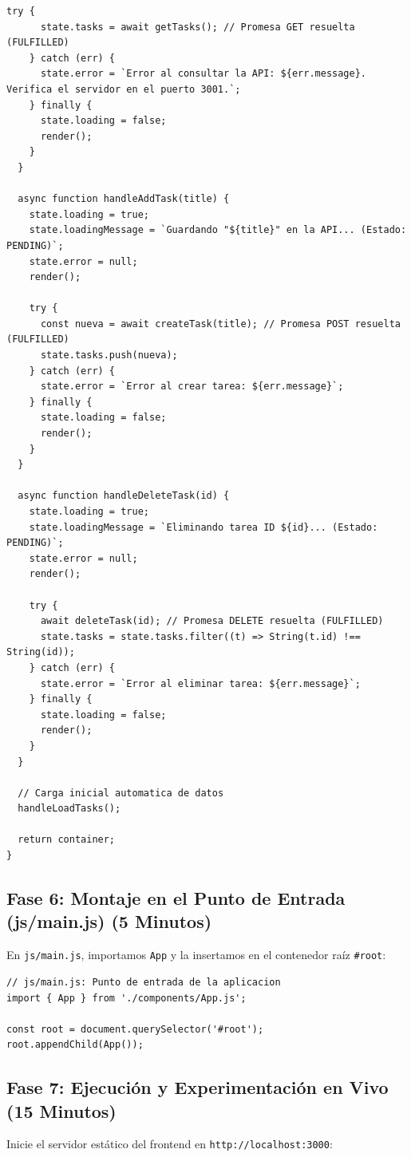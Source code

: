 \documentclass[10pt,letterpaper]{article}
\begin{document}
\begin{lstlisting}[style=jsstyle]
    try {
      state.tasks = await getTasks(); // Promesa GET resuelta (FULFILLED)
    } catch (err) {
      state.error = `Error al consultar la API: ${err.message}. Verifica el servidor en el puerto 3001.`;
    } finally {
      state.loading = false;
      render();
    }
  }

  async function handleAddTask(title) {
    state.loading = true;
    state.loadingMessage = `Guardando "${title}" en la API... (Estado: PENDING)`;
    state.error = null;
    render();

    try {
      const nueva = await createTask(title); // Promesa POST resuelta (FULFILLED)
      state.tasks.push(nueva);
    } catch (err) {
      state.error = `Error al crear tarea: ${err.message}`;
    } finally {
      state.loading = false;
      render();
    }
  }

  async function handleDeleteTask(id) {
    state.loading = true;
    state.loadingMessage = `Eliminando tarea ID ${id}... (Estado: PENDING)`;
    state.error = null;
    render();

    try {
      await deleteTask(id); // Promesa DELETE resuelta (FULFILLED)
      state.tasks = state.tasks.filter((t) => String(t.id) !== String(id));
    } catch (err) {
      state.error = `Error al eliminar tarea: ${err.message}`;
    } finally {
      state.loading = false;
      render();
    }
  }

  // Carga inicial automatica de datos
  handleLoadTasks();

  return container;
}
\end{lstlisting}

\subsection{Fase 6: Montaje en el Punto de Entrada (js/main.js) (5 Minutos)}
En \texttt{js/main.js}, importamos \texttt{App} y la insertamos en el contenedor raíz \texttt{\#root}:

\begin{lstlisting}[style=jsstyle]
// js/main.js: Punto de entrada de la aplicacion
import { App } from './components/App.js';

const root = document.querySelector('#root');
root.appendChild(App());
\end{lstlisting}

\subsection{Fase 7: Ejecución y Experimentación en Vivo (15 Minutos)}
Inicie el servidor estático del frontend en \texttt{http://localhost:3000}:
\end{document}
